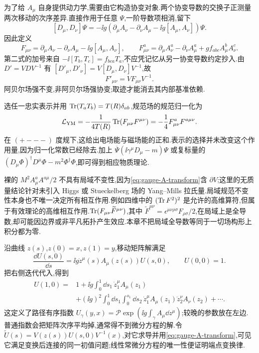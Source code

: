 为了给 $A_\mu$ 自身提供动力学,需要由它构造协变对象.两个协变导数的交换子正测量两次移动的次序差异.直接作用于任意 $\Psi$,一阶导数项相消,留下
\[
 [D_\mu,D_\nu]\Psi=-\ii g(\partial_\mu A_\nu-\partial_\nu A_\mu-\ii g[A_\mu,A_\nu])\Psi.
\]
因此定义
\begin{equation}\label{eq:ym-F}
 F_{\mu\nu}=\partial_\mu A_\nu-\partial_\nu A_\mu-\ii g[A_\mu,A_\nu],\qquad
 F_{\mu\nu}^a=\partial_\mu A_\nu^a-\partial_\nu A_\mu^a+gf_{abc}A_\mu^bA_\nu^c.
\end{equation}
第二式的加号来自 $-\ii[T_b,T_c]=f_{bca}T_a$,不应凭记忆从另一协变导数约定抄入.由 $D'=VDV^{-1}$ 有
$[D'_\mu,D'_\nu]=V[D_\mu,D_\nu]V^{-1}$,故
\[
 F'_{\mu\nu}=VF_{\mu\nu}V^{-1}.
\]
阿贝尔场强不变,非阿贝尔场强协变;取迹才能消去其内部基准依赖.

选任一忠实表示并用 $\operatorname{Tr}(T_aT_b)=T(R)\delta_{ab}$,规范场的规范归一化为
\begin{equation}\label{eq:ym-action}
 \mathcal L_{\mathrm{YM}}=-\frac1{4T(R)}\operatorname{Tr}(F_{\mu\nu}F^{\mu\nu})
 =-\frac14F_{\mu\nu}^aF^{a\mu\nu}.
\end{equation}
在 $(+---)$ 度规下,这给出电场能与磁场能的正和.表示的选择并未改变这个作用量,因为归一化常数已经除去.加上 $\overline\Psi(\ii\gamma^\mu D_\mu-m)\Psi$ 或复标量的 $(D_\mu\Phi)^\dagger D^\mu\Phi-m^2\Phi^\dagger\Phi$,即可得到相应物质理论.

裸的 $M^2 A_\mu^aA^{a\mu}/2$ 不具有局域不变性,因为\eqref{eq:gauge-A-transform}含 $\partial V$;这里的无质量结论针对未引入 Higgs 或 Stueckelberg 场的 Yang--Mills 拉氏量.局域规范不变性本身也不唯一决定所有相互作用.例如四维中的 $(\operatorname{Tr} F^2)^2$ 是允许的高维算符,但属于有效理论的高维相互作用.$\operatorname{Tr}(F_{\mu\nu}\widetilde F^{\mu\nu})$,其中 $\widetilde F^{\mu\nu}=\epsilon^{\mu\nu\rho\sigma}F_{\rho\sigma}/2$,在局域上是全导数,却可能因边界或非平凡拓扑产生效应.本章不把局域全导数等同于一切场构形上积分都为零.

沿曲线 $z(s)$,$z(0)=x,z(1)=y$,移动矩阵解满足
\[
 \frac{\dd U(s,0)}{\dd s}=\ii g\dot z^\mu(s)A_\mu(z(s))U(s,0),\qquad U(0,0)=1.
\]
把右侧迭代代入,得到
\begin{align*}
 U(1,0)={}&1+\ii g\int_0^1\dd s_1\,\dot z_1^\mu A_\mu(z_1)\\
 &+(\ii g)^2\int_0^1\dd s_1\int_0^{s_1}\dd s_2\,
 \dot z_1^\mu A_\mu(z_1)\dot z_2^\nu A_\nu(z_2)+\cdots.
\end{align*}
这定义了路径有序指数 $U_\gamma(y,x)=\mathcal P\exp(\ii g\int_\gamma A_\mu\dd z^\mu)$;较晚的参数放在左边.普通指数会把矩阵次序平均掉,通常得不到微分方程的解.令 $\widetilde U(s)=V(z(s))U(s,0)V^{-1}(x)$,对它求导并用\eqref{eq:gauge-A-transform},可见它满足变换后连接的同一初值问题;线性常微分方程的唯一性便证明端点变换律.

